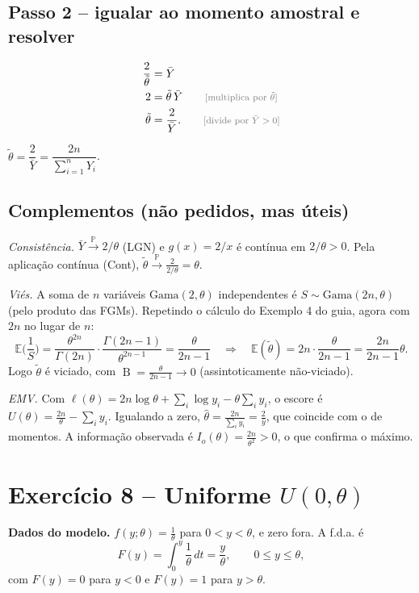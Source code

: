 \documentclass[11pt,a4paper]{article}
\newcommand{\E}{\mathbb{E}}
\newcommand{\B}{\operatorname{B}}
\newcommand{\Prob}{\mathbb{P}}
\newcommand{\convP}{\xrightarrow{\;\Prob\;}}
\newcommand{\bY}{\bar{Y}}
\newcommand{\just}[1]{\tag*{\footnotesize\textcolor{gray}{[#1]}}}
\begin{document}
\subsection*{Passo 2 -- igualar ao momento amostral e resolver}
\begin{align*}
\frac{2}{\tilde\theta}&=\bY\\
2&=\tilde\theta\,\bY \just{multiplica por $\tilde\theta$}\\
\tilde\theta&=\frac{2}{\bY}. \just{divide por $\bY>0$}
\end{align*}

\begin{resposta}
$\tilde\theta=\dfrac{2}{\bY}=\dfrac{2n}{\sum_{i=1}^nY_i}$.
\end{resposta}

\subsection*{Complementos (não pedidos, mas úteis)}
\textit{Consistência.} $\bY\convP2/\theta$ (LGN) e $g(x)=2/x$ é contínua em $2/\theta>0$. Pela aplicação contínua (Cont), $\tilde\theta\convP\frac{2}{2/\theta}=\theta$.

\textit{Viés.} A soma de $n$ variáveis $\text{Gama}(2,\theta)$ independentes é $S\sim\text{Gama}(2n,\theta)$ (pelo produto das FGMs). Repetindo o cálculo do Exemplo 4 do guia, agora com $2n$ no lugar de $n$:
\[
\E\Big(\frac1S\Big)=\frac{\theta^{2n}}{\Gamma(2n)}\cdot\frac{\Gamma(2n-1)}{\theta^{2n-1}}=\frac{\theta}{2n-1}
\quad\Longrightarrow\quad
\E(\tilde\theta)=2n\cdot\frac{\theta}{2n-1}=\frac{2n}{2n-1}\theta .
\]
Logo $\tilde\theta$ é viciado, com $\B=\frac{\theta}{2n-1}\to0$ (assintoticamente não-viciado).

\textit{EMV.} Com $\ell(\theta)=2n\log\theta+\sum_i\log y_i-\theta\sum_iy_i$, o escore é $U(\theta)=\frac{2n}{\theta}-\sum_iy_i$. Igualando a zero, $\hat\theta=\frac{2n}{\sum_iy_i}=\frac{2}{\bar y}$, que coincide com o de momentos. A informação observada é $I_o(\theta)=\frac{2n}{\theta^2}>0$, o que confirma o máximo.

\section{Exercício 8 -- Uniforme $U(0,\theta)$}

\textbf{Dados do modelo.} $f(y;\theta)=\frac1\theta$ para $0<y<\theta$, e zero fora. A f.d.a. é
\[
F(y)=\int_0^y\frac1\theta\,dt=\frac y\theta,\qquad0\le y\le\theta,
\]
com $F(y)=0$ para $y<0$ e $F(y)=1$ para $y>\theta$.
\end{document}
